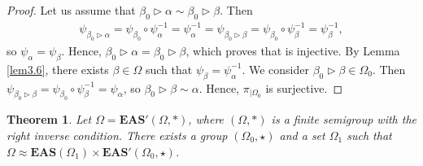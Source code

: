 \documentclass[pdftex]{sigma}
\numberwithin{equation}{section}
\newtheorem{Theorem}{Theorem}[section]
\newcommand{\eas}{\mathbf{EAS}}
\begin{document}
\begin{proof}
Let us assume that $\beta_0\triangleright \alpha\sim \beta_0\triangleright \beta$. Then
\begin{align*}
\psi_{\beta_0\triangleright \alpha}=\psi_{\beta_0}\circ \psi_\alpha^{-1}=\psi_{\alpha}^{-1}
=\psi_{\beta_0\triangleright \beta}=\psi_{\beta_0}\circ \psi_\beta^{-1}=\psi_{\beta}^{-1},
\end{align*}
so $\psi_\alpha=\psi_\beta$. Hence, $\beta_0\triangleright\alpha=\beta_0\triangleright \beta$, which proves that  is injective.
By Lemma \ref{lem3.6}, there exists $\beta \in \Omega$ such that $\psi_\beta=\psi_\alpha^{-1}$. We consider $\beta_0\triangleright \beta \in \Omega_0$. Then
$\psi_{\beta_0\triangleright \beta}=\psi_{\beta_0}\circ \psi_\beta^{-1}=\psi_\alpha$,
so $\beta_0\triangleright \beta\sim \alpha$. Hence, $\pi_{\mid \Omega_0}$ is surjective.
\end{proof}

\begin{Theorem} \label{theo3.8}
Let $\Omega=\eas'(\Omega,*)$, where $(\Omega,*)$ is a finite semigroup with the right inverse condition. There exists a group $(\Omega_0,\star)$ and a set $\Omega_1$ such that
$\Omega\approx \eas(\Omega_1)\times \eas'(\Omega_0,\star)$.
\end{Theorem}
\end{document}
